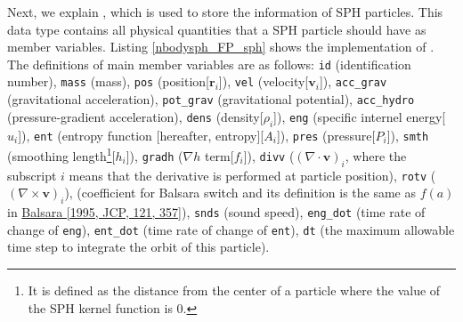 \ifCpp %

\endifCpp
\ifFtn %

\endifFtn
\ifC %

\endifC


Next, we explain , which is used to store the information of SPH particles. This data type contains all physical quantities that a SPH particle should have as member variables. Listing \ref{nbodysph_FP_sph} shows the implementation of . The definitions of main member variables are as follows: \texttt{id} (identification number), \texttt{mass} (mass), \texttt{pos} (position[$\bm{r}_{i}$]), \texttt{vel} (velocity[$\bm{v}_{i}$]), \texttt{acc\_grav} (gravitational acceleration), \texttt{pot\_grav} (gravitational potential), \texttt{acc\_hydro} (pressure-gradient acceleration), \texttt{dens} (density[$\rho_{i}$]), \texttt{eng} (specific internel energy[$u_{i}$]), \texttt{ent} (entropy function [hereafter, entropy][$A_{i}$]), \texttt{pres} (pressure[$P_{i}$]), \texttt{smth} (smoothing length\footnote{It is defined as the distance from the center of a particle where the value of the SPH kernel function is 0.}[$h_{i}$]), \texttt{gradh} ($\nabla h$ term[$f_{i}$]), \texttt{divv} ($(\nabla\cdot\bm{v})_{i}$, where the subscript $i$ means that the derivative is performed at particle position), \texttt{rotv} ($(\nabla\times\bm{v})_{i}$),  (coefficient for Balsara switch and its definition is the same as $f(a)$ in \href{https://doi.org/10.1016/S0021-9991(95)90221-X}{Balsara [1995, JCP, 121, 357]}), \texttt{snds} (sound speed), \texttt{eng\_dot} (time rate of change of \texttt{eng}), \texttt{ent\_dot} (time rate of change of \texttt{ent}), \texttt{dt} (the maximum allowable time step to integrate the orbit of this particle).

